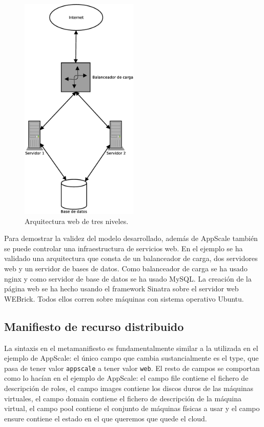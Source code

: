 \begin{figure} [!htbp]
  \centering
  \includegraphics[width=0.5\textwidth]{figuras/Arquitectura_web2.eps}
  \caption{Arquitectura web de tres niveles.}
\label{figure:arquitectura-web}
\end{figure}

Para demostrar la validez del modelo desarrollado, además de AppScale también se puede controlar una infraestructura de servicios web. En el ejemplo se ha validado una arquitectura que consta de un balanceador de carga, dos servidores web y un servidor de bases de datos. Como balanceador de carga se ha usado nginx y como servidor de base de datos se ha usado MySQL. La creación de la página web se ha hecho usando el framework Sinatra sobre el servidor web WEBrick. Todos ellos corren sobre máquinas con sistema operativo Ubuntu.\\

\subsection{Manifiesto de recurso distribuido}

La sintaxis en el metamanifiesto es fundamentalmente similar a la utilizada en el ejemplo de AppScale: el único campo que cambia sustancialmente es el type, que pasa de tener valor \texttt{appscale} a tener valor \texttt{web}. El resto de campos se comportan como lo hacían en el ejemplo de AppScale: el campo file contiene el fichero de descripción de roles, el campo images contiene los discos duros de las máquinas virtuales, el campo domain contiene el fichero de descripción de la máquina virtual, el campo pool contiene el conjunto de máquinas físicas a usar y el campo ensure contiene el estado en el que queremos que quede el cloud.

